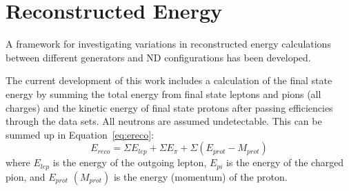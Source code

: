 \documentclass[12pt]{article}
\begin{document}

\section{Reconstructed Energy}\label{sec:Reco}

A framework for investigating variations in reconstructed energy calculations between different generators and ND configurations has been developed. %

The current development of this work includes a calculation of the final state energy by summing the total energy from final state leptons and pions (all charges) and the kinetic energy of final state protons after passing efficiencies through the data sets. All neutrons are assumed undetectable. 
This can be summed up in Equation~\ref{eq:ereco}:
\begin{equation}
E_{reco} = \Sigma {E_{lep}} + \Sigma E_{\pi} + \Sigma (E_{prot} - M_{prot})
\label{eq:ereco}
\end{equation}
where $E_{lep}$ is the energy of the outgoing lepton, $E_{pi}$ is the energy of the charged pion, and $E_{prot}$ $(M_{prot})$ is the energy (momentum) of the proton.

\end{document}
